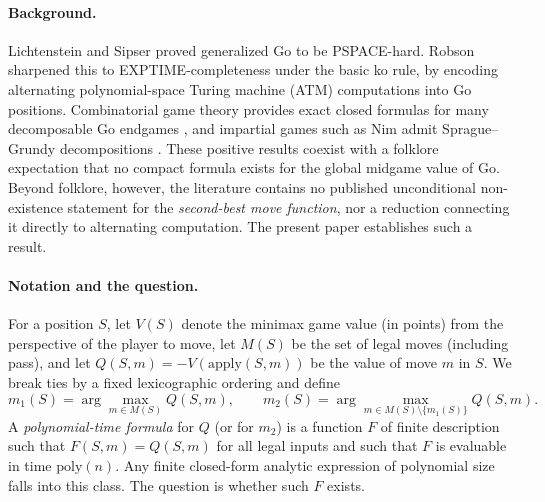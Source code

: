 \documentclass[11pt,a4paper]{amsart}
\theoremstyle{plain}
\theoremstyle{definition}
\theoremstyle{remark}
\newcommand{\Apply}{\mathrm{apply}}
\begin{document}
\paragraph{Background.}
Lichtenstein and Sipser \cite{LS80} proved generalized Go to be
PSPACE-hard. Robson \cite{Rob83} sharpened this to EXPTIME-completeness
under the basic ko rule, by encoding alternating polynomial-space Turing
machine (ATM) computations into Go positions. Combinatorial game theory
provides exact closed formulas for many decomposable Go endgames
\cite{BW94}, and impartial games such as Nim admit Sprague--Grundy
decompositions \cite{Con76}. These positive results coexist with a
folklore expectation that no compact formula exists for the global
midgame value of Go. Beyond folklore, however, the literature contains
no published unconditional non-existence statement for the
\emph{second-best move function}, nor a reduction connecting it directly
to alternating computation. The present paper establishes such a result.

\paragraph{Notation and the question.}
For a position $S$, let $V(S)$ denote the minimax game value (in points)
from the perspective of the player to move, let $M(S)$ be the set of
legal moves (including pass), and let
$Q(S,m) = -V(\Apply(S,m))$ be the value of move $m$ in $S$. We break
ties by a fixed lexicographic ordering and define
\[
  m_1(S) = \arg\max_{m \in M(S)} Q(S,m),
  \qquad
  m_2(S) = \arg\max_{m \in M(S) \setminus \{m_1(S)\}} Q(S,m).
\]
A \emph{polynomial-time formula} for $Q$ (or for $m_2$) is a function
$F$ of finite description such that $F(S,m) = Q(S,m)$ for all legal
inputs and such that $F$ is evaluable in time $\mathrm{poly}(n)$. Any
finite closed-form analytic expression of polynomial size falls into
this class. The question is whether such $F$ exists.
\end{document}
